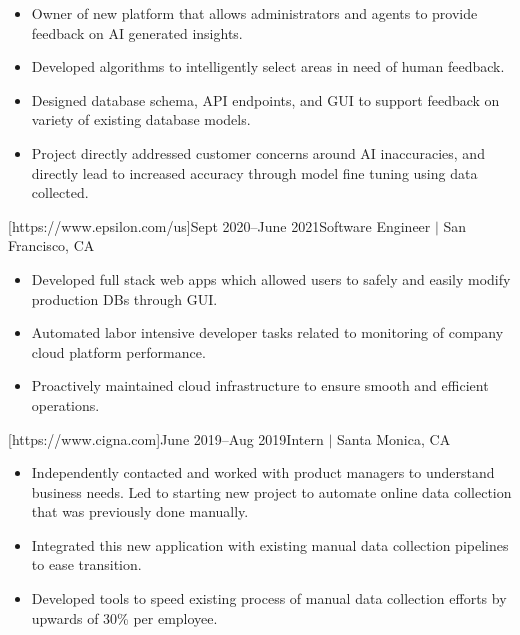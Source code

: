 \documentclass[letterpaper,11pt]{article}
\newcommand{\Item}[1]{
  \item\small{
    \parbox[t]{500pt}{\raggedright#1}
  }
}
\newenvironment{HeadingList}{
  \begin{mdframed}[
    topline=false,
    bottomline=false,
    rightline=false,
    leftline=false,
    linecolor=gray,
    linewidth=0pt,
    leftmargin=0pt,
    innerleftmargin=0pt,
    innertopmargin=0pt,
    innerbottommargin=0pt,
    innerrightmargin=0pt,
    skipabove=\parsep,
    skipbelow=\parsep,
  ]
  \begin{itemize}[leftmargin=0pt, label={}]
}{
  \end{itemize}
  \end{mdframed}
}
\newenvironment{SubHeadingList}{
  \begin{mdframed}[
    leftline=true,
    linecolor=gray,
    linewidth=.5pt,
    leftmargin=8pt,
    innerleftmargin=8pt,
  ]
  \begin{itemize}[leftmargin=0pt, label={}]
}{
  \end{itemize}
  \end{mdframed}
}
\newenvironment{ItemList}{
  \begin{itemize}[itemsep=4pt, topsep=-3pt, partopsep=0pt, parsep=0pt, leftmargin=20pt, label=\raisebox{0.4ex}{\scalebox{0.5}{\textbullet}}]
}{\end{itemize}}
\begin{document}
\begin{HeadingList}
\begin{SubHeadingList}
                \begin{ItemList}
                    \Item{Owner of new platform that allows administrators and agents to provide feedback on AI generated insights.}
                    \Item{Developed algorithms to intelligently select areas in need of human feedback.}
                    \Item{Designed database schema, API endpoints, and GUI to support feedback on variety of existing database models.}
                    \Item{Project directly addressed customer concerns around AI inaccuracies, and directly lead to increased accuracy through model fine tuning using data collected.}
                \end{ItemList}

            \end{SubHeadingList}


        [https://www.epsilon.com/us]{Sept 2020--June 2021}{Software Engineer $|$ San Francisco, CA}
            \begin{SubHeadingList}

                \begin{ItemList}
                    \Item{Developed full stack web apps which allowed users to safely and easily modify production DBs through GUI.}
                    \Item{Automated labor intensive developer tasks related to monitoring of company cloud platform performance.}
                    \Item{Proactively maintained cloud infrastructure to ensure smooth and efficient operations.}
                \end{ItemList}

            \end{SubHeadingList}

        [https://www.cigna.com]{June 2019--Aug 2019}{Intern $|$ Santa Monica, CA}
            \begin{SubHeadingList}

                \begin{ItemList}
                    \Item{Independently contacted and worked with product managers to understand business needs. Led to starting new project to automate online data collection that was previously done manually.}
                    \Item{Integrated this new application with existing manual data collection pipelines to ease transition.}
                    \Item{Developed tools to speed existing process of manual data collection efforts by upwards of 30\% per employee.}
                \end{ItemList}

            \end{SubHeadingList}
    \end{HeadingList}
\end{document}
